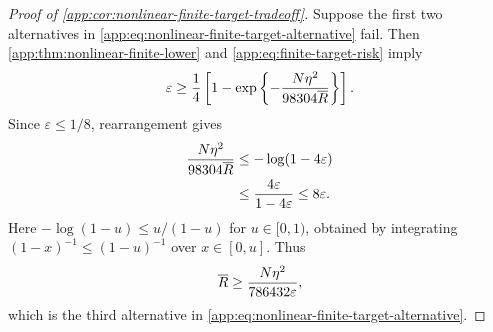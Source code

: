 \begin{proof}[Proof of
\cref{app:cor:nonlinear-finite-target-tradeoff}]
Suppose the first two alternatives in
\eqref{app:eq:nonlinear-finite-target-alternative} fail. Then
\cref{app:thm:nonlinear-finite-lower} and
\eqref{app:eq:finite-target-risk} imply
\[
 \varepsilon
 \ge
 \frac14\left[
  1-\exp\left\{-\frac{N\eta^2}{98304\overline R{}}\right\}
 \right].
\]
Since \(\varepsilon\le1/8\), rearrangement gives
\begin{align*}
 \frac{N\eta^2}{98304\overline R{}}
 &\le-\log(1-4\varepsilon)\\
 &\le\frac{4\varepsilon}{1-4\varepsilon}
 \le8\varepsilon.
\end{align*}
Here \(-\log(1-u)\le u/(1-u)\) for \(u\in[0,1)\), obtained by integrating
\((1-x)^{-1}\le(1-u)^{-1}\) over \(x\in[0,u]\). Thus
\[
 \overline R{}\ge\frac{N\eta^2}{786432\varepsilon},
\]
which is the third alternative in
\eqref{app:eq:nonlinear-finite-target-alternative}.
\end{proof}
